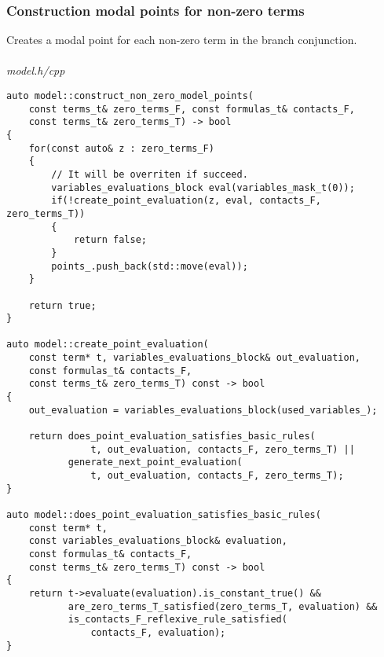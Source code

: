 \documentclass{article}
\begin{document}
	\subsubsection*{Construction modal points for non-zero terms}
	Creates a modal point for each non-zero term in the branch conjunction.
\\
\\
\noindent
\textit{model.h/cpp}
\begin{lstlisting}
auto model::construct_non_zero_model_points(
	const terms_t& zero_terms_F, const formulas_t& contacts_F,
	const terms_t& zero_terms_T) -> bool
{
    for(const auto& z : zero_terms_F)
    {
        // It will be overriten if succeed.
        variables_evaluations_block eval(variables_mask_t(0));
        if(!create_point_evaluation(z, eval, contacts_F, zero_terms_T))
        {
            return false;
        }
        points_.push_back(std::move(eval));
    }

    return true;
}

auto model::create_point_evaluation(
	const term* t, variables_evaluations_block& out_evaluation,
	const formulas_t& contacts_F,
	const terms_t& zero_terms_T) const -> bool
{
    out_evaluation = variables_evaluations_block(used_variables_);

    return does_point_evaluation_satisfies_basic_rules(
               t, out_evaluation, contacts_F, zero_terms_T) ||
           generate_next_point_evaluation(
               t, out_evaluation, contacts_F, zero_terms_T);
}

auto model::does_point_evaluation_satisfies_basic_rules(
	const term* t,
	const variables_evaluations_block& evaluation,
	const formulas_t& contacts_F,
	const terms_t& zero_terms_T) const -> bool
{
    return t->evaluate(evaluation).is_constant_true() &&
           are_zero_terms_T_satisfied(zero_terms_T, evaluation) &&
           is_contacts_F_reflexive_rule_satisfied(
               contacts_F, evaluation);
}
\end{lstlisting}
\newpage
\end{document}
